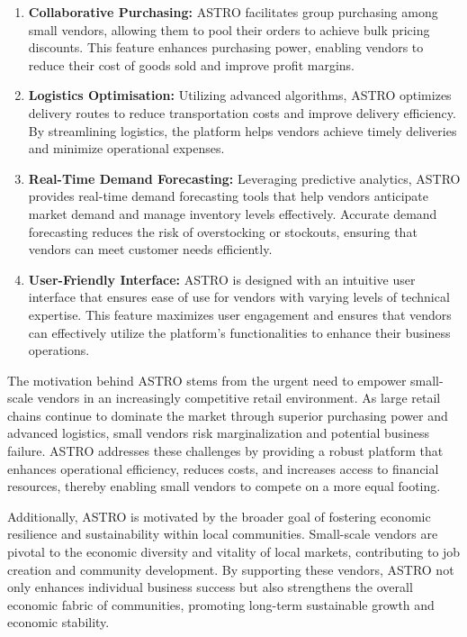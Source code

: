 \begin{enumerate}
	\item \textbf{Collaborative Purchasing:} ASTRO facilitates group purchasing among small vendors, allowing them to pool their orders to achieve bulk pricing discounts. This feature enhances purchasing power, enabling vendors to reduce their cost of goods sold and improve profit margins.

	\item \textbf{Logistics Optimisation:} Utilizing advanced algorithms, ASTRO optimizes delivery routes to reduce transportation costs and improve delivery efficiency. By streamlining logistics, the platform helps vendors achieve timely deliveries and minimize operational expenses.

	\item \textbf{Real-Time Demand Forecasting:} Leveraging predictive analytics, ASTRO provides real-time demand forecasting tools that help vendors anticipate market demand and manage inventory levels effectively. Accurate demand forecasting reduces the risk of overstocking or stockouts, ensuring that vendors can meet customer needs efficiently.

	\item \textbf{User-Friendly Interface:} ASTRO is designed with an intuitive user interface that ensures ease of use for vendors with varying levels of technical expertise. This feature maximizes user engagement and ensures that vendors can effectively utilize the platform’s functionalities to enhance their business operations.
\end{enumerate}

The motivation behind ASTRO stems from the urgent need to empower small-scale vendors in an increasingly competitive retail environment. As large retail chains continue to dominate the market through superior purchasing power and advanced logistics, small vendors risk marginalization and potential business failure. ASTRO addresses these challenges by providing a robust platform that enhances operational efficiency, reduces costs, and increases access to financial resources, thereby enabling small vendors to compete on a more equal footing.

Additionally, ASTRO is motivated by the broader goal of fostering economic resilience and sustainability within local communities. Small-scale vendors are pivotal to the economic diversity and vitality of local markets, contributing to job creation and community development. By supporting these vendors, ASTRO not only enhances individual business success but also strengthens the overall economic fabric of communities, promoting long-term sustainable growth and economic stability.
